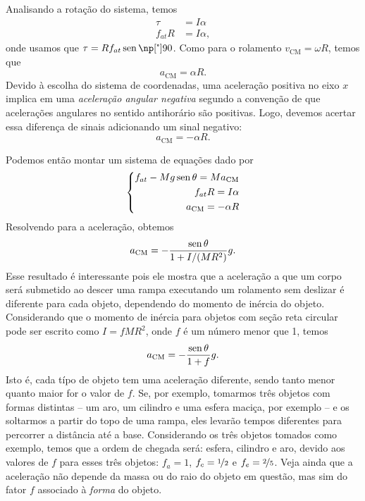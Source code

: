 Analisando a rotação do sistema, temos
\begin{align}
  \tau &= I\alpha \\
  f_{at} R &=I\alpha,
\end{align}
%
onde usamos que $\tau = R f_{at} \sen\degree{90}$. Como para o rolamento $v_{\textrm{CM}} = \omega R$, temos que 
\begin{equation}
  a_{\textrm{CM}} = \alpha R.
\end{equation}
%
Devido à escolha do sistema de coordenadas, uma aceleração positiva no eixo $x$ implica em uma \emph{aceleração angular negativa} segundo a convenção de que acelerações angulares no sentido antihorário são positivas. Logo, devemos acertar essa diferença de sinais adicionando um sinal negativo:
\begin{equation}
  a_{\textrm{CM}} = -\alpha R.
\end{equation}

Podemos então montar um sistema de equações dado por
\begin{equation}
\left\{ \begin{aligned} f_{at} - Mg\operatorname{sen}\theta = M a_{\textrm{CM}} \\ f_{at}R = I\alpha \\ a_{\textrm{CM}} = -\alpha R \end{aligned}\right.
\end{equation}
%
Resolvendo para a aceleração, obtemos
\begin{equation}
  a_{\textrm{CM}} = -\frac{\operatorname{sen}\theta}{1+I/(MR^2)} g.
\end{equation}
%
Esse resultado é interessante pois ele mostra que a aceleração a que um corpo será submetido ao descer uma rampa executando um rolamento sem deslizar é diferente para cada objeto, dependendo do momento de inércia do objeto. Considerando que o momento de inércia para objetos com seção reta circular pode ser escrito como $I = f MR^2$, onde $f$ é um número menor que 1, temos
\begin{equation}
  a_{\textrm{CM}} = -\frac{\operatorname{sen}\theta}{1+f} g.
\end{equation}
%
Isto é, cada típo de objeto tem uma aceleração diferente, sendo tanto menor quanto maior for o valor de $f$. Se, por exemplo, tomarmos três objetos com formas distintas -- um aro, um cilindro e uma esfera maciça, por exemplo -- e os soltarmos a partir do topo de uma rampa, eles levarão tempos diferentes para percorrer a distância até a base. Considerando os três objetos tomados como exemplo, temos que a ordem de chegada será: esfera, cilindro e aro, devido aos valores de $f$ para esses três objetos: $f_a = 1$, $f_c = \nicefrac{1}{2}$ e $f_e = \nicefrac{2}{5}$. Veja ainda que a aceleração não depende da massa ou do raio do objeto em questão, mas sim do fator $f$ associado à \emph{forma} do objeto.

